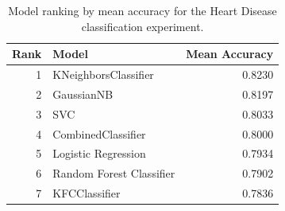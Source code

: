 \begin{table}
\caption{Model ranking by mean accuracy for the Heart Disease classification experiment.}
\label{tab:heart_model_ranking}
\begin{tabular}{rlr}
\toprule
Rank & Model & Mean Accuracy \\
\midrule
1 & KNeighborsClassifier & 0.8230 \\
2 & GaussianNB & 0.8197 \\
3 & SVC & 0.8033 \\
4 & CombinedClassifier & 0.8000 \\
5 & Logistic Regression & 0.7934 \\
6 & Random Forest Classifier & 0.7902 \\
7 & KFCClassifier & 0.7836 \\
\bottomrule
\end{tabular}
\end{table}
